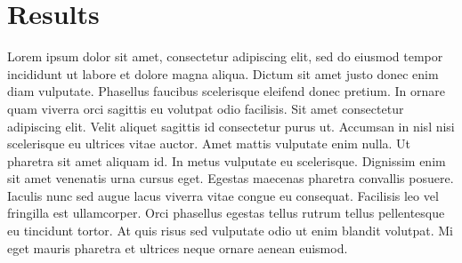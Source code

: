 \documentclass[letterpaper,10pt]{article}
\begin{document}
\section{Results}
Lorem ipsum dolor sit amet, consectetur adipiscing elit, sed do eiusmod tempor incididunt ut labore et dolore magna aliqua. Dictum sit amet justo donec enim diam vulputate. Phasellus faucibus scelerisque eleifend donec pretium. In ornare quam viverra orci sagittis eu volutpat odio facilisis. Sit amet consectetur adipiscing elit. Velit aliquet sagittis id consectetur purus ut. Accumsan in nisl nisi scelerisque eu ultrices vitae auctor. Amet mattis vulputate enim nulla. Ut pharetra sit amet aliquam id. In metus vulputate eu scelerisque. Dignissim enim sit amet venenatis urna cursus eget. Egestas maecenas pharetra convallis posuere. Iaculis nunc sed augue lacus viverra vitae congue eu consequat. Facilisis leo vel fringilla est ullamcorper. Orci phasellus egestas tellus rutrum tellus pellentesque eu tincidunt tortor. At quis risus sed vulputate odio ut enim blandit volutpat. Mi eget mauris pharetra et ultrices neque ornare aenean euismod.






\end{document}
